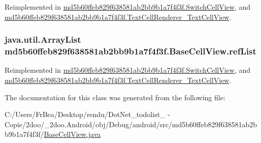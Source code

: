 Reimplemented in \hyperlink{classmd5b60ffeb829f638581ab2bb9b1a7f4f3f_1_1_switch_cell_view_1153176f1114dedfcdc6c831e33adfea}{md5b60ffeb829f638581ab2bb9b1a7f4f3f.SwitchCellView}, and \hyperlink{classmd5b60ffeb829f638581ab2bb9b1a7f4f3f_1_1_text_cell_renderer___text_cell_view_00b3617596bc3d87d289d2fa7895a853}{md5b60ffeb829f638581ab2bb9b1a7f4f3f.TextCellRenderer\_\-TextCellView}.\hypertarget{classmd5b60ffeb829f638581ab2bb9b1a7f4f3f_1_1_base_cell_view_da428ae06aa11eb73b64b1723a81985b}{
\subsubsection[{refList}]{\setlength{\rightskip}{0pt plus 5cm}java.util.ArrayList {\bf md5b60ffeb829f638581ab2bb9b1a7f4f3f.BaseCellView.refList}}}
\label{classmd5b60ffeb829f638581ab2bb9b1a7f4f3f_1_1_base_cell_view_da428ae06aa11eb73b64b1723a81985b}




Reimplemented in \hyperlink{classmd5b60ffeb829f638581ab2bb9b1a7f4f3f_1_1_switch_cell_view_66bff703a87b9110a0b7ec44c8abfffb}{md5b60ffeb829f638581ab2bb9b1a7f4f3f.SwitchCellView}, and \hyperlink{classmd5b60ffeb829f638581ab2bb9b1a7f4f3f_1_1_text_cell_renderer___text_cell_view_f83f0ccc30bfc43d4b87f8e0bc0790c4}{md5b60ffeb829f638581ab2bb9b1a7f4f3f.TextCellRenderer\_\-TextCellView}.

The documentation for this class was generated from the following file:\begin{CompactItemize}
\item 
C:/Users/FrBea/Desktop/rendu/DotNet\_\-todolist\_ - Copie/2doo/\_\-2doo.Android/obj/Debug/android/src/md5b60ffeb829f638581ab2bb9b1a7f4f3f/\hyperlink{_base_cell_view_8java}{BaseCellView.java}\end{CompactItemize}

